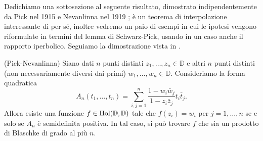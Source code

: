 Dedichiamo una sottosezione al seguente risultato, dimostrato indipendentemente da Pick nel 1915 \cite{P} e Nevanlinna nel 1919 \cite{N}; è un teorema di interpolazione interessante di per sé, inoltre vedremo un paio di esempi in cui le ipotesi vengono riformulate in termini del lemma di Schwarz-Pick, usando in un caso anche il rapporto iperbolico. Seguiamo la dimostrazione vista in \cite[Chapter 1, Theorem 2.2]{JBG}.

\begin{thm}
  (Pick-Nevanlinna) Siano dati $n$ punti distinti $z_1, \dots, z_n \in \mathbb{D}$ e altri $n$ punti distinti (non necessariamente diversi dai primi) $w_1, \dots, w_n \in \mathbb{D}$. Consideriamo la forma quadratica
  $$A_n(t_1,\dots,t_n)=\sum_{i,j=1}^n\frac{1-w_i\bar{w}_j}{1-z_i\bar{z}_j}t_i\bar{t}_j.$$
  Allora esiste una funzione $f \in \normalfont{\text{Hol}}(\mathbb{D},\mathbb{D})$ tale che $f(z_i)=w_i$ per $j=1, \dots, n$ se e solo se $A_n$ è semidefinita positiva. In tal caso, si può trovare $f$ che sia un prodotto di Blaschke di grado al più $n$.
\end{thm}

